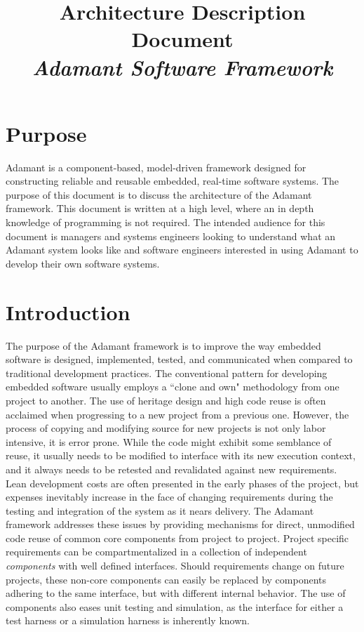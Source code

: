 



\title{\textbf{Architecture Description Document} \\
\large\textit{Adamant Software Framework}}
\date{}
\maketitle

\section{Purpose}
Adamant is a component-based, model-driven framework designed for constructing reliable and reusable embedded, real-time software systems. The purpose of this document is to discuss the architecture of the Adamant framework. This document is written at a high level, where an in depth knowledge of programming is not required. The intended audience for this document is managers and systems engineers looking to understand what an Adamant system looks like and software engineers interested in using Adamant to develop their own software systems.

\section{Introduction}

The purpose of the Adamant framework is to improve the way embedded software is designed, implemented, tested, and communicated when compared to traditional development practices. The conventional pattern for developing embedded software usually employs a ``clone and own" methodology from one project to another. The use of heritage design and high code reuse is often acclaimed when progressing to a new project from a previous one. However, the process of copying and modifying source for new projects is not only labor intensive, it is error prone. While the code might exhibit some semblance of reuse, it usually needs to be modified to interface with its new execution context, and it always needs to be retested and revalidated against new requirements. Lean development costs are often presented in the early phases of the project, but expenses inevitably increase in the face of changing requirements during the testing and integration of the system as it nears delivery. The Adamant framework addresses these issues by providing mechanisms for direct, unmodified code reuse of common core components from project to project. Project specific requirements can be compartmentalized in a collection of independent \textit{components} with well defined interfaces. Should requirements change on future projects, these non-core components can easily be replaced by components adhering to the same interface, but with different internal behavior. The use of components also eases unit testing and simulation, as the interface for either a test harness or a simulation harness is inherently known.

